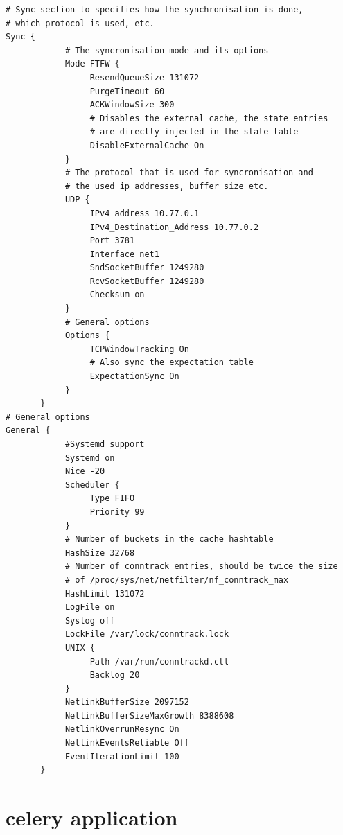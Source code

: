 \documentclass{report}
\begin{document}
\begin{verbatim}
# Sync section to specifies how the synchronisation is done,
# which protocol is used, etc.
Sync {
            # The syncronisation mode and its options
            Mode FTFW {
                 ResendQueueSize 131072
                 PurgeTimeout 60
                 ACKWindowSize 300
                 # Disables the external cache, the state entries
                 # are directly injected in the state table
                 DisableExternalCache On
            }
            # The protocol that is used for syncronisation and
            # the used ip addresses, buffer size etc.
            UDP {
                 IPv4_address 10.77.0.1
                 IPv4_Destination_Address 10.77.0.2
                 Port 3781
                 Interface net1
                 SndSocketBuffer 1249280
                 RcvSocketBuffer 1249280
                 Checksum on
            }
            # General options
            Options {
                 TCPWindowTracking On
                 # Also sync the expectation table
                 ExpectationSync On
            }
       }
# General options
General {
            #Systemd support
            Systemd on
            Nice -20
            Scheduler {
                 Type FIFO
                 Priority 99
            }
            # Number of buckets in the cache hashtable
            HashSize 32768
            # Number of conntrack entries, should be twice the size
            # of /proc/sys/net/netfilter/nf_conntrack_max
            HashLimit 131072
            LogFile on
            Syslog off
            LockFile /var/lock/conntrack.lock
            UNIX {
                 Path /var/run/conntrackd.ctl
                 Backlog 20
            }
            NetlinkBufferSize 2097152
            NetlinkBufferSizeMaxGrowth 8388608
            NetlinkOverrunResync On
            NetlinkEventsReliable Off
            EventIterationLimit 100
       }
\end{verbatim}

\section{celery application}\label{celery-application}
\end{document}
